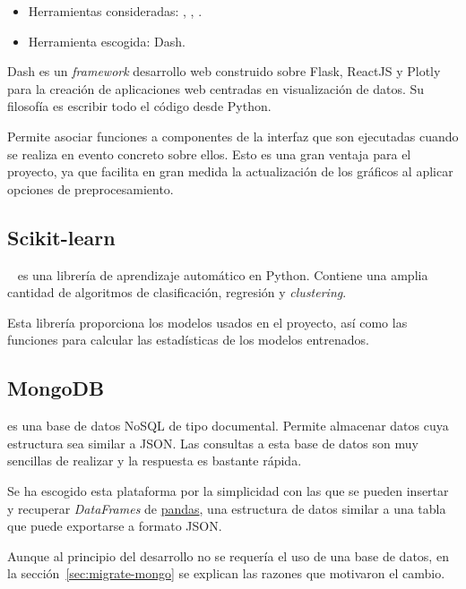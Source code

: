 \begin{itemize}
	\tightlist
	\item Herramientas consideradas: ,
	,
	.
	\item Herramienta escogida: Dash.
\end{itemize}

Dash es un \textit{framework} desarrollo web construido sobre Flask, ReactJS y
Plotly para la creación de aplicaciones web centradas en visualización de datos.
Su filosofía es escribir todo el código desde Python.

Permite asociar funciones a componentes de la interfaz que son ejecutadas cuando
se realiza en evento concreto sobre ellos. Esto es una gran ventaja para el
proyecto, ya que facilita en gran medida la actualización de los gráficos al
aplicar opciones de preprocesamiento.

\subsection{Scikit-learn}

~\cite{art:scikit-learn} es
una librería de aprendizaje automático en Python. Contiene una amplia cantidad
de algoritmos de clasificación, regresión y \textit{clustering}.

Esta librería proporciona los modelos usados en el proyecto, así como las
funciones para calcular las estadísticas de los modelos entrenados.

\subsection{MongoDB}

 es una base de datos NoSQL de
tipo documental. Permite almacenar datos cuya estructura sea similar a JSON. Las
consultas a esta base de datos son muy sencillas de realizar y la respuesta es
bastante rápida.

Se ha escogido esta plataforma por la simplicidad con las que se pueden insertar
y recuperar \textit{DataFrames} de \href{https://pandas.pydata.org/}{pandas},
una estructura de datos similar a una tabla que puede exportarse a formato JSON.

Aunque al principio del desarrollo no se requería el uso de una base de datos,
en la sección~\ref{sec:migrate-mongo} se explican las razones que motivaron el
cambio.

